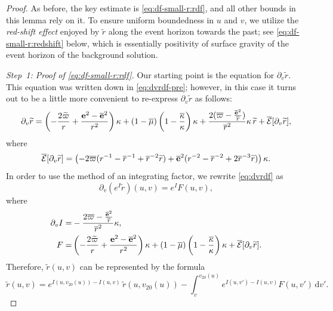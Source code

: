 \documentclass[10pt, reqno]{amsart}
\theoremstyle{definition}
\theoremstyle{remark}
\theoremstyle{conjecture}
\numberwithin{equation}{section}
\newcommand{\ud}{\mathrm{d}}
\newcommand{\rd}{\partial}
\newcommand{\0}{\emptyset}
\newcommand{\kpp}{\kappa}
\newcommand{\lmb}{\lambda}
\newcommand{\bfe}{{\bf e}}
\newcommand{\calE}{\mathcal E}
\newcommand{\dvr}{\lmb}
\newcommand{\pfstep}[1]{\vspace{.5em} {\it \noindent #1.}}
\newcommand{\e}{\bfe}							%
\newcommand{\rbg}{\overline{r}}					%
\newcommand{\varpibg}{\overline{\varpi}}				%
\newcommand{\mubg}{\overline{\mu}}				%
\newcommand{\kppbg}{\overline{\kpp}}					%
\newcommand{\ebg}{\overline{\e}}					%
\newcommand{\rdf}{\widetilde{r}}					%
\newcommand{\varpidf}{\widetilde{\varpi}}				%
\begin{document}
\begin{proof}
As before, the key estimate is \eqref{eq:df-small-r:rdf}, and all other bounds in this lemma rely on it. To ensure uniform boundedness in $u$ and $v$, we utilize the \emph{red-shift effect} enjoyed by $\rdf$ along the event horizon towards the past; see \eqref{eq:df-small-r:redshift} below, which is essentially positivity of surface gravity of the event horizon of the background solution.

\pfstep{Step~1: Proof of \eqref{eq:df-small-r:rdf}}
Our starting point is the equation for $\rd_{v} \rdf$. This equation was written down in \eqref{eq:dvrdf-pre}; however, in this case it turns out to be a little more convenient to re-express $\rd_{v} \rdf$ as follows:
\begin{equation} \label{eq:dvrdf}
	\rd_{v} \rdf = \left( - \frac{2 \varpidf}{r} + \frac{\e^{2} - \ebg^{2}}{r^{2}} \right) \kpp + (1-\mubg) \left( 1- \frac{\kppbg}{\kpp}\right) \kpp+ \frac{2(\varpibg - \frac{\ebg^{2}}{\rbg})}{\rbg^{2}} \kpp \, \rdf  + \overline{\calE}[\rd_{v} \rdf],
\end{equation}
where
\begin{equation*}
	\overline{\calE}[\rd_{v} \rdf] = \left( - 2 \varpibg (r^{-1} - \rbg^{-1} + \rbg^{-2} \rdf) + \ebg^{2} (r^{-2} - \rbg^{-2} + 2 \rbg^{-3} \rdf)  \right) \kpp.
\end{equation*}
In order to use the method of an integrating factor, we rewrite \eqref{eq:dvrdf} as
\begin{equation*}
	\rd_{v} (e^{I} \rdf)(u, v) = e^{I} F(u ,v), 
\end{equation*}
where
\begin{align*}
	\rd_{v} I = & - \frac{2 \varpibg - \frac{\ebg^{2}}{\rbg}}{\rbg^{2}} \kpp, \\
	F =& \left( - \frac{2 \varpidf}{r} + \frac{\e^{2} - \ebg^{2}}{r^{2}} \right) \kpp + (1-\mubg) \left( 1- \frac{\kppbg}{\kpp}\right) \kpp + \overline{\calE}[\rd_{v} \rdf].
\end{align*}
Therefore, $\rdf(u, v)$ can be represented by the formula
\begin{equation} \label{eq:dvrdf-rf}
	\rdf(u, v) 
	= e^{I(u, v_{20}(u)) - I(u, v)} \, \rdf(u, v_{20}(u)) - \int_{v}^{v_{20}(u)} e^{I(u, v') - I(u, v)} F(u, v') \, \ud v'.
\end{equation}


\end{proof}
\end{document}
